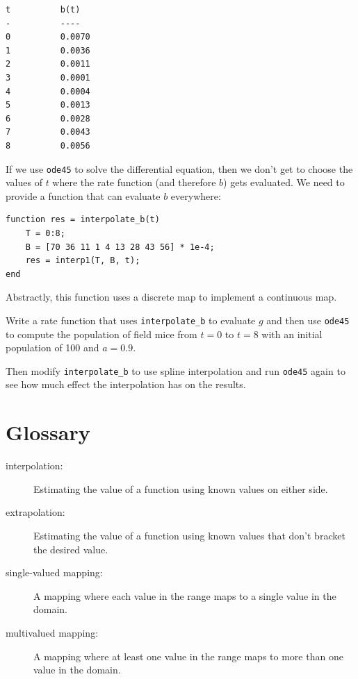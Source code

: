 \documentclass{book}
\begin{document}
\begin{verbatim}
t          b(t)
-          ----
0          0.0070
1          0.0036
2          0.0011
3          0.0001
4          0.0004
5          0.0013
6          0.0028
7          0.0043
8          0.0056
\end{verbatim}

If we use {\tt ode45} to solve the differential equation, then we
don't get to choose the values of $t$ where the rate function
(and therefore $b$) gets evaluated.  We need to provide a function
that can evaluate $b$ everywhere:

\begin{verbatim}
function res = interpolate_b(t)
    T = 0:8;
    B = [70 36 11 1 4 13 28 43 56] * 1e-4;
    res = interp1(T, B, t);
end
\end{verbatim}

Abstractly, this function uses a discrete map to implement a
continuous map.

\begin{ex}
Write a rate function that uses
{\tt interpolate\_b} to evaluate $g$ and then
use {\tt ode45} to compute the population of field mice
from $t=0$ to $t=8$ with an initial population of 100 and
$a=0.9$.

Then modify {\tt interpolate\_b} to use spline interpolation
and run {\tt ode45} again to see how much effect the interpolation
has on the results.
\end{ex}

\section{Glossary}

\begin{description}

\item[interpolation:] Estimating the value of a function using
known values on either side.

\item[extrapolation:] Estimating the value of a function using
known values that don't bracket the desired value.

\item[single-valued mapping:] A mapping where each value in the
range maps to a single value in the domain.

\item[multivalued mapping:] A mapping where at least one value in
the range maps to more than one value in the domain.

\end{description}
\end{document}
